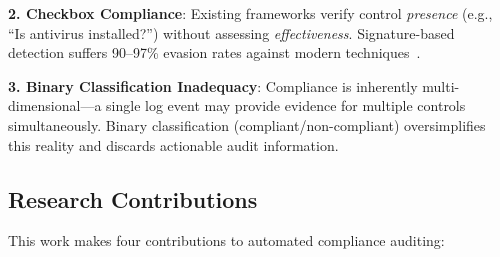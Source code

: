 \documentclass[futureinternet,article,submit,pdftex,moreauthors]{Definitions/mdpi}
\begin{document}
\textbf{2. Checkbox Compliance}: Existing frameworks verify control \textit{presence}
(e.g., ``Is antivirus installed?'') without assessing \textit{effectiveness}. Signature-based
detection suffers 90--97\% evasion rates against modern techniques~\cite{dp_payload_paper,reverse_shell_paper}.

\textbf{3. Binary Classification Inadequacy}: Compliance is inherently multi-dimensional—a
single log event may provide evidence for multiple controls simultaneously. Binary
classification (compliant/non-compliant) oversimplifies this reality and discards actionable
audit information.

\subsection{Research Contributions}

This work makes four contributions to automated compliance auditing:
\end{document}
